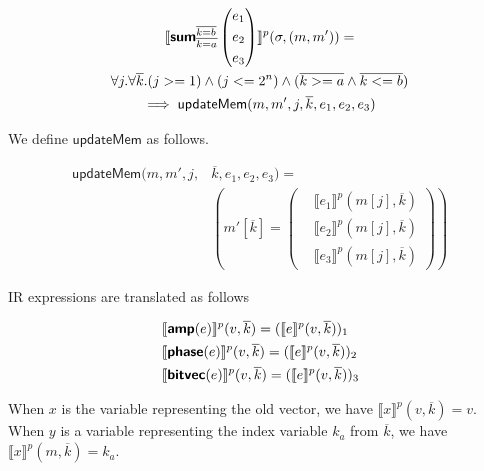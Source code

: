 \documentclass[runningheads]{llncs}
\newcommand {\sem} [1] {\llbracket #1 \rrbracket}
\newcommand {\Psem} [1] {\sem{#1}^p}
\newcommand {\ir} [1] {\textsf{\textbf{#1}}}
\newcommand {\irSum} {\ir{sum}}
\newcommand {\irAmp} {\ir{amp}}
\newcommand {\irPhase} {\ir{phase}}
\newcommand {\irBV} {\ir{bitvec}}
\newcommand {\updateMem} {\textsf{updateMem}}
\begin{document}
\begin{multline*}
  \Psem{\irSum_{\overline{k=a}}^{\overline{k=b}}
    \left(\begin{aligned}
      &e_1\\
      &e_2\\
      &e_3
    \end{aligned}\right)}(\sigma, (m, m')) =\\
    \forall j. \forall \overline{k}. (j >= 1) \land (j <= 2^n) \land (\overline{k >= a} \land \overline{k <= b})\\
    \implies \updateMem(m, m', j, \overline{k}, e_1, e_2, e_3)
\end{multline*}

We define $\updateMem$ as follows.

\[
\begin{aligned}
  \updateMem(m, m', j, &\overline{k}, e_1, e_2, e_3) =\\
    &\left(m'[\overline{k}] = \left(\begin{aligned}
                          &\Psem{e_1}(m[j], \overline{k})\\
                          &\Psem{e_2}(m[j], \overline{k})\\
                          &\Psem{e_3}(m[j], \overline{k})
    \end{aligned}\right)\right)
\end{aligned}
\]

\noindent
IR expressions are translated as follows

\begin{align*}
  &\Psem{\irAmp(e)}(v, \overline{k}) = (\Psem{e}(v, \overline{k}))_1\\
  &\Psem{\irPhase(e)}(v, \overline{k}) = (\Psem{e}(v, \overline{k}))_2\\
  &\Psem{\irBV(e)}(v, \overline{k}) = (\Psem{e}(v, \overline{k}))_3
\end{align*}

When $x$ is the variable representing the old vector, we have $\Psem{x}(v, \overline{k}) = v$. When $y$ is a variable representing the index variable $k_a$ from $\overline{k}$, we have $\Psem{x}(m, \overline{k}) = k_a$.
\end{document}
